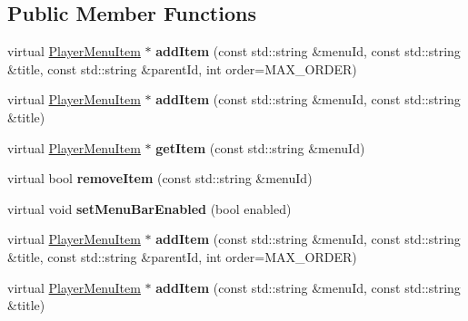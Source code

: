 \subsection*{Public Member Functions}
\begin{DoxyCompactItemize}
\item 
\mbox{\label{classPlayerMenuServiceMac_a1c29b918fd46107bda88d07be7dd6442}} 
virtual \hyperlink{classPlayerMenuItem}{Player\+Menu\+Item} $\ast$ {\bfseries add\+Item} (const std\+::string \&menu\+Id, const std\+::string \&title, const std\+::string \&parent\+Id, int order=M\+A\+X\+\_\+\+O\+R\+D\+ER)
\item 
\mbox{\label{classPlayerMenuServiceMac_a80e8a76bb8d23124ba379775e628642a}} 
virtual \hyperlink{classPlayerMenuItem}{Player\+Menu\+Item} $\ast$ {\bfseries add\+Item} (const std\+::string \&menu\+Id, const std\+::string \&title)
\item 
\mbox{\label{classPlayerMenuServiceMac_a000f07b5b1eaa142230d8a519798d44a}} 
virtual \hyperlink{classPlayerMenuItem}{Player\+Menu\+Item} $\ast$ {\bfseries get\+Item} (const std\+::string \&menu\+Id)
\item 
\mbox{\label{classPlayerMenuServiceMac_a1bb4a12889ebfdbf8abdfa9d5566a0aa}} 
virtual bool {\bfseries remove\+Item} (const std\+::string \&menu\+Id)
\item 
\mbox{\label{classPlayerMenuServiceMac_adaae5d556024753947e1f72fd4736b6b}} 
virtual void {\bfseries set\+Menu\+Bar\+Enabled} (bool enabled)
\item 
\mbox{\label{classPlayerMenuServiceMac_a746910a0fbfa17761b1c0295070fed77}} 
virtual \hyperlink{classPlayerMenuItem}{Player\+Menu\+Item} $\ast$ {\bfseries add\+Item} (const std\+::string \&menu\+Id, const std\+::string \&title, const std\+::string \&parent\+Id, int order=M\+A\+X\+\_\+\+O\+R\+D\+ER)
\item 
\mbox{\label{classPlayerMenuServiceMac_a7dd233e6154df48c0a005730136bb487}} 
virtual \hyperlink{classPlayerMenuItem}{Player\+Menu\+Item} $\ast$ {\bfseries add\+Item} (const std\+::string \&menu\+Id, const std\+::string \&title)

\end{DoxyCompactItemize}
